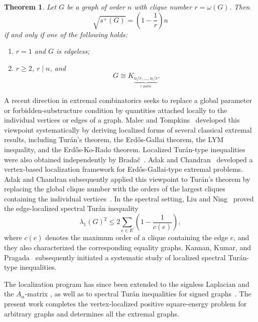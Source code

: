\documentclass[11pt]{article}
\numberwithin{equation}{section}
\newtheorem{theorem}{Theorem}[section]
\theoremstyle{definition}
\theoremstyle{remark}
\newcommand{\splus}{s^{+}}
\begin{document}
	\begin{theorem} \cite{jayarajan2026equalitycasepositivesquareenergy}\label{thm;globaleq}
		Let $G$ be a graph of order $n$ with clique number $r=\omega(G)$. Then
		\begin{equation}\label{eq:main_result}
			\sqrt{\splus(G)}
			=\left(1-\frac{1}{r}\right)n
		\end{equation}
		if and only if one of the following holds:
		\begin{enumerate}[label=\textup{(\roman*)}]
			\item $r=1$ and $G$ is edgeless;
			\item $r\geq 2$, $r\mid n$, and
			\[
			G\cong K_{\underbrace{n/r,\ldots,n/r}_{r\text{ parts}}}.
			\]
		\end{enumerate}
	\end{theorem}
	A recent direction in extremal combinatorics seeks to replace a global
	parameter or forbidden-substructure condition by quantities attached
	locally to the individual vertices or edges of a graph. Malec and
	Tompkins~\cite{MR4568750} developed this viewpoint systematically
	by deriving localized forms of several classical extremal results,
	including Tur\'an's theorem, the Erd\H{o}s-Gallai theorem, the
	LYM inequality, and the Erd\H{o}s-Ko-Rado theorem. Localized Tur\'an-type inequalities were also obtained independently
	by Brada\v{c}~\cite{Bradac2022}. Adak and
	Chandran~\cite{adak2025vertex} developed a vertex-based localization
	framework for Erd\H{o}s-Gallai-type extremal problems. Adak and Chandran subsequently applied this viewpoint to Tur\'an's theorem by replacing
	the global clique number with the orders of the largest cliques
	containing the individual vertices~\cite{adak2025vertexbasedlocalizationturanstheorem}. In the
	spectral setting, Liu and Ning~\cite{MR4964125} proved the
	edge-localized spectral Tur\'an inequality
	\[
	\lambda_1(G)^2
	\leq
	2\sum_{e\in E}
	\left(1-\frac1{c(e)}\right),
	\]
	where $c(e)$ denotes the maximum order of a clique containing the
	edge $e$, and they also characterized the corresponding equality
	graphs. Kannan, Kumar, and
	Pragada~\cite{kannan2025localizationspectralturantypetheorems} subsequently initiated a
	systematic study of localized spectral Tur\'an-type inequalities.
	
	The localization program has since been extended to
	the signless Laplacian and the $A_\alpha$-matrix 
	\cite{kannan2026localizedturantypeinequalitiesqindex}, as well as to spectral Tur\'an
	inequalities for signed graphs~\cite{xie2026localization}. The present work
	completes the vertex-localized positive square-energy problem for
	arbitrary graphs and determines all the extremal graphs.
	
\end{document}
